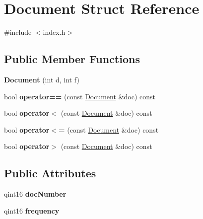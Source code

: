 \hypertarget{structDocument}{
\section{Document Struct Reference}
\label{structDocument}
}


{\ttfamily \#include $<$index.h$>$}

\subsection*{Public Member Functions}
\begin{DoxyCompactItemize}
\item 
\hypertarget{structDocument_a058069ce7959daa404b5097f92d028d4}{
{\bfseries Document} (int d, int f)}
\label{structDocument_a058069ce7959daa404b5097f92d028d4}

\item 
\hypertarget{structDocument_a163f064a09288d13d7c858d2bf54c64b}{
bool {\bfseries operator==} (const \hyperlink{structDocument}{Document} \&doc) const }
\label{structDocument_a163f064a09288d13d7c858d2bf54c64b}

\item 
\hypertarget{structDocument_a9e68f761e18f5779395b3a9af4bce821}{
bool {\bfseries operator$<$} (const \hyperlink{structDocument}{Document} \&doc) const }
\label{structDocument_a9e68f761e18f5779395b3a9af4bce821}

\item 
\hypertarget{structDocument_a20deac96e13a15a0a67fd233c9f1ed31}{
bool {\bfseries operator$<$=} (const \hyperlink{structDocument}{Document} \&doc) const }
\label{structDocument_a20deac96e13a15a0a67fd233c9f1ed31}

\item 
\hypertarget{structDocument_a2268b8ca2b1b6929046c848d3ef41486}{
bool {\bfseries operator$>$} (const \hyperlink{structDocument}{Document} \&doc) const }
\label{structDocument_a2268b8ca2b1b6929046c848d3ef41486}

\end{DoxyCompactItemize}
\subsection*{Public Attributes}
\begin{DoxyCompactItemize}
\item 
\hypertarget{structDocument_a851a6e37b220a442a4d15bc6dacfd5d8}{
qint16 {\bfseries docNumber}}
\label{structDocument_a851a6e37b220a442a4d15bc6dacfd5d8}

\item 
\hypertarget{structDocument_a07eb09b689bd87696fe173ec5a1f493a}{
qint16 {\bfseries frequency}}
\label{structDocument_a07eb09b689bd87696fe173ec5a1f493a}

\end{DoxyCompactItemize}


